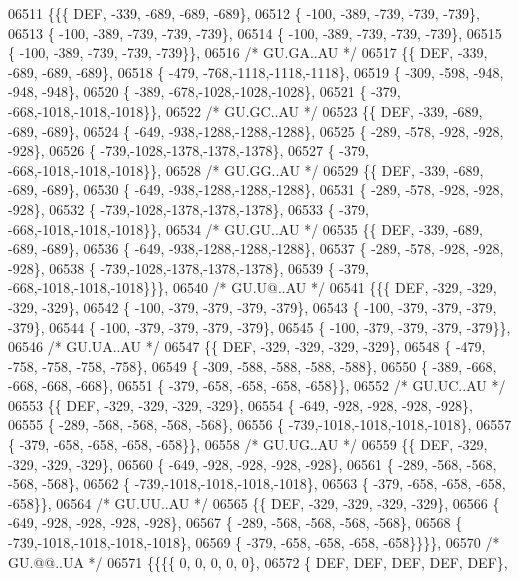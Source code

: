 \begin{DoxyCode}
06511 \{\{\{  DEF, -339, -689, -689, -689\},
06512 \{ -100, -389, -739, -739, -739\},
06513 \{ -100, -389, -739, -739, -739\},
06514 \{ -100, -389, -739, -739, -739\},
06515 \{ -100, -389, -739, -739, -739\}\},
06516 \textcolor{comment}{/* GU.GA..AU */}
06517 \{\{  DEF, -339, -689, -689, -689\},
06518 \{ -479, -768,-1118,-1118,-1118\},
06519 \{ -309, -598, -948, -948, -948\},
06520 \{ -389, -678,-1028,-1028,-1028\},
06521 \{ -379, -668,-1018,-1018,-1018\}\},
06522 \textcolor{comment}{/* GU.GC..AU */}
06523 \{\{  DEF, -339, -689, -689, -689\},
06524 \{ -649, -938,-1288,-1288,-1288\},
06525 \{ -289, -578, -928, -928, -928\},
06526 \{ -739,-1028,-1378,-1378,-1378\},
06527 \{ -379, -668,-1018,-1018,-1018\}\},
06528 \textcolor{comment}{/* GU.GG..AU */}
06529 \{\{  DEF, -339, -689, -689, -689\},
06530 \{ -649, -938,-1288,-1288,-1288\},
06531 \{ -289, -578, -928, -928, -928\},
06532 \{ -739,-1028,-1378,-1378,-1378\},
06533 \{ -379, -668,-1018,-1018,-1018\}\},
06534 \textcolor{comment}{/* GU.GU..AU */}
06535 \{\{  DEF, -339, -689, -689, -689\},
06536 \{ -649, -938,-1288,-1288,-1288\},
06537 \{ -289, -578, -928, -928, -928\},
06538 \{ -739,-1028,-1378,-1378,-1378\},
06539 \{ -379, -668,-1018,-1018,-1018\}\}\},
06540 \textcolor{comment}{/* GU.U@..AU */}
06541 \{\{\{  DEF, -329, -329, -329, -329\},
06542 \{ -100, -379, -379, -379, -379\},
06543 \{ -100, -379, -379, -379, -379\},
06544 \{ -100, -379, -379, -379, -379\},
06545 \{ -100, -379, -379, -379, -379\}\},
06546 \textcolor{comment}{/* GU.UA..AU */}
06547 \{\{  DEF, -329, -329, -329, -329\},
06548 \{ -479, -758, -758, -758, -758\},
06549 \{ -309, -588, -588, -588, -588\},
06550 \{ -389, -668, -668, -668, -668\},
06551 \{ -379, -658, -658, -658, -658\}\},
06552 \textcolor{comment}{/* GU.UC..AU */}
06553 \{\{  DEF, -329, -329, -329, -329\},
06554 \{ -649, -928, -928, -928, -928\},
06555 \{ -289, -568, -568, -568, -568\},
06556 \{ -739,-1018,-1018,-1018,-1018\},
06557 \{ -379, -658, -658, -658, -658\}\},
06558 \textcolor{comment}{/* GU.UG..AU */}
06559 \{\{  DEF, -329, -329, -329, -329\},
06560 \{ -649, -928, -928, -928, -928\},
06561 \{ -289, -568, -568, -568, -568\},
06562 \{ -739,-1018,-1018,-1018,-1018\},
06563 \{ -379, -658, -658, -658, -658\}\},
06564 \textcolor{comment}{/* GU.UU..AU */}
06565 \{\{  DEF, -329, -329, -329, -329\},
06566 \{ -649, -928, -928, -928, -928\},
06567 \{ -289, -568, -568, -568, -568\},
06568 \{ -739,-1018,-1018,-1018,-1018\},
06569 \{ -379, -658, -658, -658, -658\}\}\}\},
06570 \textcolor{comment}{/* GU.@@..UA */}
06571 \{\{\{\{    0,    0,    0,    0,    0\},
06572 \{  DEF,  DEF,  DEF,  DEF,  DEF\},

\end{DoxyCode}
